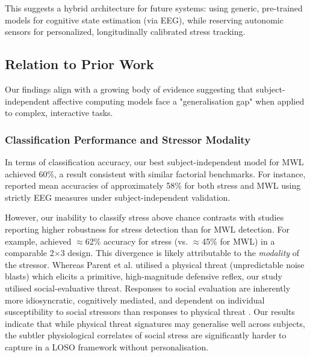 \documentclass[lettersize,journal]{IEEEtran}
\begin{document}
This suggests a hybrid architecture for future systems: using generic, pre-trained models for cognitive state estimation (via EEG), while reserving autonomic sensors for personalized, longitudinally calibrated stress tracking.

\subsection{Relation to Prior Work}

Our findings align with a growing body of evidence suggesting that subject-independent affective computing models face a "generalisation gap" when applied to complex, interactive tasks. 

\subsubsection{Classification Performance and Stressor Modality}
In terms of classification accuracy, our best subject-independent model for MWL achieved 60\%, a result consistent with similar factorial benchmarks. For instance, \cite{bagheriSimultaneousClassificationBoth2022} reported mean accuracies of approximately 58\% for both stress and MWL using strictly EEG measures under subject-independent validation. 

However, our inability to classify stress above chance contrasts with studies reporting higher robustness for stress detection than for MWL detection. For example, \cite{parentDiagnosticityPsychophysiologicalSignatures2019} achieved $\approx$62\% accuracy for stress (vs. $\approx$45\% for MWL) in a comparable 2$\times$3 design. This divergence is likely attributable to the \textit{modality} of the stressor. Whereas Parent et al. utilised a physical threat (unpredictable noise blasts) which elicits a primitive, high-magnitude defensive reflex, our study utilised social-evaluative threat. Responses to social evaluation are inherently more idiosyncratic, cognitively mediated, and dependent on individual susceptibility to social stressors than responses to physical threat \cite{campbell-sillsPsychometricPropertiesSubjective2006}. Our results indicate that while physical threat signatures may generalise well across subjects, the subtler physiological correlates of social stress are significantly harder to capture in a LOSO framework without personalisation.
\end{document}
